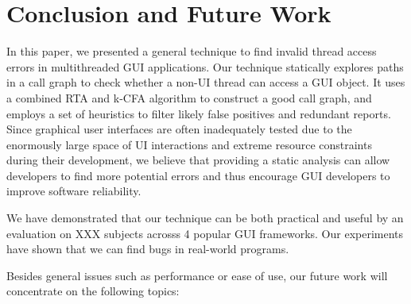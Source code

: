 \section{Conclusion and Future Work}

In this paper, we presented a general technique to find invalid
thread access errors in multithreaded GUI applications. 
Our technique statically explores paths in a call graph to check
whether a non-UI thread can access a GUI object.
It uses a combined RTA and k-CFA algorithm to construct
a good call graph, and employs a set of heuristics to
filter likely false positives and redundant reports.
Since graphical user interfaces are often inadequately tested due
to the enormously large space of UI interactions and
extreme resource constraints during their development, we
believe that providing a static analysis can allow developers to find
more potential errors %
and thus encourage GUI developers to improve software reliability.

We have demonstrated that our technique can be both practical and useful
by an evaluation on XXX subjects acrosss 4 popular GUI
frameworks. Our experiments have shown that we can find bugs
in real-world programs.


Besides general issues such as performance or ease of use, our future
work will concentrate on the following topics:

